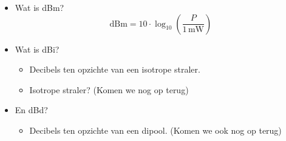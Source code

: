 \begin{itemize}
    \item Wat is dBm? 
    \[ \text{dBm} = 10 \cdot \log_{10}\left(\frac{P}{1 \, \text{mW}}\right) \]
  
    \item Wat is dBi? 
    \begin{itemize}
      \item Decibels ten opzichte van een isotrope straler.
      \item Isotrope straler? (Komen we nog op terug)
    \end{itemize}
  
    \item En dBd? 
    \begin{itemize}
      \item Decibels ten opzichte van een dipool. (Komen we ook nog op terug)
    \end{itemize}
  \end{itemize}
